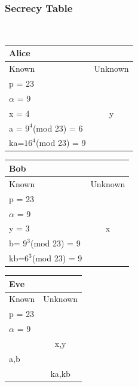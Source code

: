 \documentclass{article}
\begin{document}
\subsubsection{Secrecy Table}
\begin{centre}
\begin{tabular} 
\                 \footnotesize
                \begin{minipage}{0.35\textwidth}
                \raggedright
                \begin{tabular}{|p{1.5cm}|c|}
                    \hline
                    Alice&\\ \hline
                    Known&Unknown \\ \hline
                    p = 23&\\ \hline
                    $\alpha$ = 9& \\ \hline   
                    x = 4& y\\ \hline
                    a = $9^4$(mod 23) = 6& \\ \hline   
                    ka=$16^4$(mod 23) = 9&\\
                    \hline
                \end{tabular}
                \end{minipage}
                \begin{minipage}[c]{0.35\textwidth}
                \begin{tabular}{|p{1.5cm}|c|}
                    \hline
                    Bob&\\ \hline
                    Known&Unknown \\ \hline
                    p = 23&\\ \hline
                    $\alpha$ = 9& \\ \hline   
                    y = 3 & x\\ \hline
                    b= $9^3$(mod 23) = 9& \\ \hline kb=$6^3$(mod 23) = 9&\\
                    \hline
                \end{tabular}
                \end{minipage}%
                \begin{minipage}[c]{0.35\textwidth}
                \begin{tabular}{|p{1.5cm}|c|}
                    \hline
                    Eve&\\ \hline
                    Known&Unknown \\ \hline
                    p = 23&\\ \hline
                    $\alpha$ = 9& \\ \hline   
                    &x,y\\ \hline
                    a,b & \\ \hline  
                    & ka,kb \\ \hline
                \end{tabular}
                \end{minipage}
\end{tabular}
\end{centre}
\end{document}
